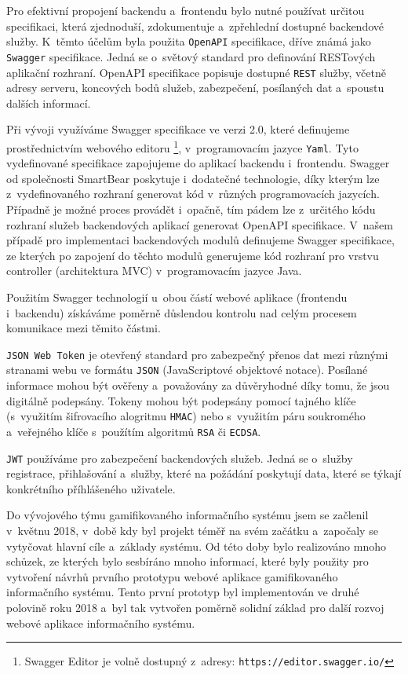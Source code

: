 \documentclass[twoside, 12pt]{article}
\begin{document}
{Pro efektivní propojení backendu a~frontendu bylo nutné používat určitou specifikaci,
která zjednoduší, zdokumentuje a~zpřehlední dostupné backendové služby.
K~těmto účelům byla použita \texttt{OpenAPI} specifikace, dříve známá jako \texttt{Swagger} specifikace.
Jedná se o~světový standard pro definování RESTových aplikační rozhraní.
OpenAPI specifikace popisuje dostupné \texttt{REST} služby, včetně adresy serveru,
koncových bodů služeb, zabezpečení, posílaných dat a~spoustu dalších informací.
\par
Při vývoji využíváme Swagger specifikace ve verzi 2.0, které definujeme prostřednictvím
webového editoru
\footnote{Swagger Editor je volně dostupný z~adresy: \texttt{https://editor.swagger.io/}},
v~programovacím jazyce \texttt{Yaml}.
Tyto vydefinované specifikace zapojujeme do aplikací backendu i~frontendu.
Swagger od společnosti SmartBear poskytuje i~dodatečné technologie,
díky kterým lze z~vydefinovaného rozhraní generovat kód v~různých programovacích jazycích.
Případně je možné proces provádět i~opačně, tím pádem lze z~určitého kódu
rozhraní služeb backendových aplikací generovat OpenAPI specifikace.
V~našem případě pro implementaci backendových modulů definujeme Swagger specifikace,
ze kterých po zapojení do těchto modulů generujeme kód rozhraní pro vrstvu controller
(architektura MVC) v~programovacím jazyce Java.
\par
Použitím Swagger technologií u~obou částí webové aplikace (frontendu i~backendu)
získáváme poměrně důslendou kontrolu nad celým procesem komunikace mezi těmito částmi.

\texttt{JSON Web Token} je otevřený standard pro zabezpečný přenos dat
mezi různými stranami webu ve formátu \texttt{JSON} (JavaScriptové objektové notace).
Posílané informace mohou být ověřeny a~považovány za důvěryhodné
díky tomu, že jsou digitálně podepsány. Tokeny mohou být podepsány
pomocí tajného klíče (s~využitím šifrovacího alogritmu \texttt{HMAC}) nebo
s~využitím páru soukromého a~veřejného klíče s~použítím algoritmů \texttt{RSA} či \texttt{ECDSA}.
\cite{jwt}
\par
\texttt{JWT} používáme pro zabezpečení backendových služeb.
Jedná se o~služby registrace, přihlašování a~služby, které na požádání poskytují
data, které se týkají konkrétního příhlášeného uživatele.



Do vývojového týmu gamifikovaného informačního systému jsem se začlenil v~květnu 2018,
v~době kdy byl projekt téměř na svém začátku a~započaly se vytyčovat hlavní cíle a~základy systému.
Od této doby bylo realizováno mnoho schůzek, ze kterých bylo sesbíráno mnoho informací,
které byly použity pro vytvoření návrhů prvního prototypu webové aplikace gamifikovaného informačního systému.
Tento první prototyp byl implementován ve druhé polovině roku 2018 a~byl tak vytvořen poměrně solidní základ
pro další rozvoj webové aplikace informačního systému.

}
\end{document}
